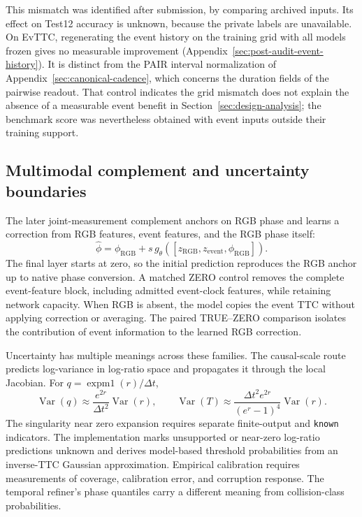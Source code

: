 This mismatch was identified after submission, by comparing archived inputs. Its effect on Test12 accuracy is unknown, because the private labels are unavailable. On EvTTC, regenerating the event history on the training grid with all models frozen gives no measurable improvement (Appendix~\ref{sec:post-audit-event-history}). It is distinct from the PAIR interval normalization of Appendix~\ref{sec:canonical-cadence}, which concerns the duration fields of the pairwise readout. That control indicates the grid mismatch does not explain the absence of a measurable event benefit in Section~\ref{sec:design-analysis}; the benchmark score was nevertheless obtained with event inputs outside their training support.

\subsection{Multimodal complement and uncertainty boundaries}
The later joint-measurement complement anchors on RGB phase and learns a correction from RGB features, event features, and the RGB phase itself:
\begin{equation}
 \widehat\phi=\phi_{\mathrm{RGB}}+s\,g_\theta
   ([z_{\mathrm{RGB}},z_{\mathrm{event}},\phi_{\mathrm{RGB}}]).
\end{equation}
The final layer starts at zero, so the initial prediction reproduces the RGB anchor up to native phase conversion. A matched ZERO control removes the complete event-feature block, including admitted event-clock features, while retaining network capacity. When RGB is absent, the model copies the event TTC without applying correction or averaging. The paired TRUE--ZERO comparison isolates the contribution of event information to the learned RGB correction. 

Uncertainty has multiple meanings across these families. The causal-scale route predicts log-variance in log-ratio space and propagates it through the local Jacobian. For $q=\operatorname{expm1}(r)/\Delta t$,
\begin{equation}
 \operatorname{Var}(q)\approx \frac{e^{2r}}{\Delta t^2}\operatorname{Var}(r),\qquad
 \operatorname{Var}(T)\approx \frac{\Delta t^2e^{2r}}{(e^r-1)^4}\operatorname{Var}(r).
\end{equation}
The singularity near zero expansion requires separate finite-output and \texttt{known} indicators. The implementation marks unsupported or near-zero log-ratio predictions unknown and derives model-based threshold probabilities from an inverse-TTC Gaussian approximation. Empirical calibration requires measurements of coverage, calibration error, and corruption response. The temporal refiner's phase quantiles carry a different meaning from collision-class probabilities. 

